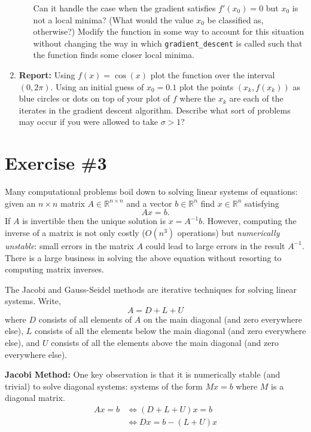 \documentclass[12pt]{article}
\begin{document}
\begin{enumerate}
\begin{itemize}
      Can it handle the case when the gradient satisfies $f'(x_0) = 0$ but $x_0$
      is not a local minima? (What would the value $x_0$ be classified as,
      otherwise?) Modify the function in some way to account for this situation
      without changing the way in which {\tt gradient\_descent} is called such
      that the function finds some closer local minima.
  \end{itemize}
\item {\bf Report:} Using $f(x) = \cos(x)$ plot the function over the interval
  $(0,2 \pi)$. Using an initial guess of $x_0 = 0.1$ plot the points $(x_k,
  f(x_k))$ as blue circles or dots on top of your plot of $f$ where the $x_k$
  are each of the iterates in the gradient descent algorithm. Describe what sort
  of problems may occur if you were allowed to take $\sigma > 1$?
\end{enumerate}




\section*{Exercise \#3}



Many computational problems boil down to solving linear systems of equations:
given an $n \times n$ matrix $A \in \mathbb{R}^{n \times n}$ and a vector $b \in
\mathbb{R}^n$ find $x \in \mathbb{R}^n$ satisfying
\[
  Ax = b.
\]
If $A$ is invertible then the unique solution is $x = A^{-1}b$. However,
computing the inverse of a matrix is not only costly ($O(n^3)$ operations) but
{\it numerically unstable}: small errors in the matrix $A$ could lead to large
errors in the result $A^{-1}$. There is a large business in solving the above
equation without resorting to computing matrix inverses.

The Jacobi and Gauss-Seidel methods are iterative techniques for solving linear
systems. Write,
\[
  A = D + L + U
\]
where $D$ consists of all elements of $A$ on the main diagonal (and zero
everywhere else), $L$ consists of all the elements below the main diagonal (and
zero everywhere else), and $U$ consists of all the elements above the main
diagonal (and zero everywhere else).

{\bf Jacobi Method:} One key observation is that it is numerically stable (and
trivial) to solve diagonal systems: systems of the form $Mx=b$ where $M$ is a
diagonal matrix.
\begin{align*}
  Ax = b
& \Leftrightarrow
(D + L + U)x = b \\
&\Leftrightarrow
Dx = b - (L + U)x
\end{align*}
\end{document}
